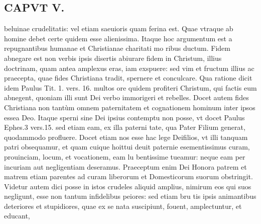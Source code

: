 \documentclass{article}
\begin{document}
\begin{pages}
\section*{CAPVT  V. }
\marginpar{[ p.267 ]}\pstart beluinae crudelitatis: vel etiam saeuioris quam ferina est. Quae vtraque ab homine debet certe quidem esse alienissima. Itaque hoc argumentum est a repugnantibus humanae et Christianae charitati mo ribus ductum.  \pend\pstart Fidem abnegare est non verbis ipsis disertis abiurare fidem in Christum, illius doctrinam, quam antea amplexus eras, iam exspuere: sed vim et fructum illius ac praecepta, quae fides Christiana tradit, spernere et conculcare. Qua ratione dicit idem Paulus Tit. 1. vers. 16. multos ore quidem profiteri Christum, qui factis eum abnegent, quoniam illi sunt Dei verbo immorigeri et rebelles. Docet autem fides Christiana non tantùm omnem paternitatem et cognationem hominum inter ipsos essea Deo. Itaque sperni sine Dei ipsius contemptu non posse, vt docet Paulus Ephes.3 vers.15. sed etiam eam, ex illa paterni tate, qua Pater Filium generat, quodammodo profluere. Docet etiam nos esse hac lege Deifilios, vt illi tanquam patri obsequamur, et quam cuique hoittui deuit paternie esementissimus curam, prouinciam, locum, et vocationem, eam lu bentissime tueamur: neque eam per incuriam aut negligentiam deseramus. Praeceptum enim Dei Honora patrem et matrem etiam parentes ad curam liberorum et Domesticorum suorum obstringit.  \pend\pstart Videtur autem dici posse in istos crudeles aliquid amplius, nimirum eos qui suos negligunt, esse non tantum infidelibus peiores: sed etiam bru tis ipsis animantibus deteriores et stupidiores, quae ex se nata suscipiunt, fouent, amplectuntur, et educant,  \pend

\end{pages}
\end{document}
